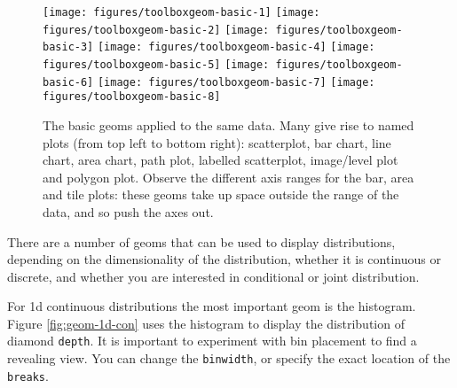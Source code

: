 \begin{figure}

{\centering \texttt{[image: figures/toolboxgeom-basic-1]} \texttt{[image: figures/toolboxgeom-basic-2]} \texttt{[image: figures/toolboxgeom-basic-3]} \texttt{[image: figures/toolboxgeom-basic-4]} \texttt{[image: figures/toolboxgeom-basic-5]} \texttt{[image: figures/toolboxgeom-basic-6]} \texttt{[image: figures/toolboxgeom-basic-7]} \texttt{[image: figures/toolboxgeom-basic-8]} 

}

\caption{The basic geoms applied to the same data. Many give rise to named plots (from top left to bottom right): scatterplot, bar chart, line chart, area chart, path plot, labelled scatterplot, image/level plot and polygon plot. Observe the different axis ranges for the bar, area and tile plots: these geoms take up space outside the range of the data, and so push the axes out.\label{fig:geom-basic}}
\end{figure}


There are a number of geoms that can be used to display distributions,
depending on the dimensionality of the distribution, whether it is
continuous or discrete, and whether you are interested in conditional or
joint distribution. 

For 1d continuous distributions the most important geom is the
histogram. Figure \ref{fig:geom-1d-con} uses the histogram to display
the distribution of diamond \texttt{depth}. It is important to
experiment with bin placement to find a revealing view. You can change
the \texttt{binwidth}, or specify the exact location of the
\texttt{breaks}.  

\begin{Shaded}
\begin{Highlighting}[]
\NormalTok{)}
\NormalTok{, }
      \NormalTok{(}\NormalTok{, }\NormalTok{), }\NormalTok{)}
\end{Highlighting}
\end{Shaded}

